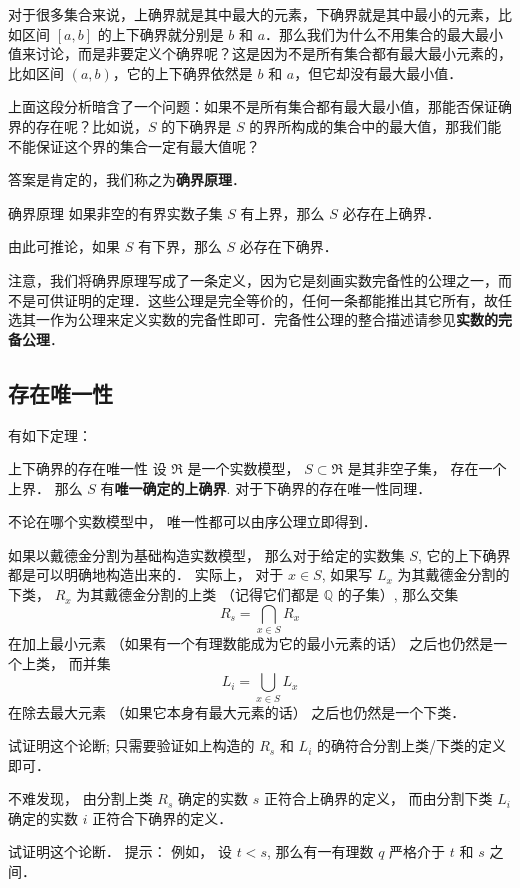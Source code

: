 对于很多集合来说，上确界就是其中最大的元素，下确界就是其中最小的元素，比如区间 $[a, b]$ 的上下确界就分别是 $b$ 和 $a$．那么我们为什么不用集合的最大最小值来讨论，而是非要定义个确界呢？这是因为不是所有集合都有最大最小元素的，比如区间 $(a, b)$，它的上下确界依然是 $b$ 和 $a$，但它却没有最大最小值．

上面这段分析暗含了一个问题：如果不是所有集合都有最大最小值，那能否保证确界的存在呢？比如说，$S$ 的下确界是 $S$ 的界所构成的集合中的最大值，那我们能不能保证这个界的集合一定有最大值呢？

答案是肯定的，我们称之为\textbf{确界原理}．

\begin{definition}{确界原理}
如果非空的有界实数子集 $S$ 有上界，那么 $S$ 必存在上确界．

由此可推论，如果 $S$ 有下界，那么 $S$ 必存在下确界．
\end{definition}

注意，我们将确界原理写成了一条定义，因为它是刻画实数完备性的公理之一，而不是可供证明的定理．这些公理是完全等价的，任何一条都能推出其它所有，故任选其一作为公理来定义实数的完备性即可．完备性公理的整合描述请参见\textbf{实数的完备公理}．

\subsection{存在唯一性}
有如下定理：

\begin{theorem}{上下确界的存在唯一性}
设 $\mathfrak{R}$ 是一个实数模型， $S\subset\mathfrak{R}$ 是其非空子集， 存在一个上界． 那么 $S$ 有\textbf{唯一确定的上确界}. 对于下确界的存在唯一性同理．
\end{theorem}

不论在哪个实数模型中， 唯一性都可以由序公理立即得到．

如果以戴德金分割为基础构造实数模型， 那么对于给定的实数集 $S$, 它的上下确界都是可以明确地构造出来的． 实际上， 对于 $x\in S$, 如果写 $L_x$ 为其戴德金分割的下类， $R_x$ 为其戴德金分割的上类 （记得它们都是 $\mathbb{Q}$ 的子集）, 那么交集
$$
R_s=\bigcap_{x\in S}R_x
$$
在加上最小元素 （如果有一个有理数能成为它的最小元素的话） 之后也仍然是一个上类， 而并集
$$
L_i=\bigcup_{x\in S}L_x
$$
在除去最大元素 （如果它本身有最大元素的话） 之后也仍然是一个下类．

\begin{exercise}{}
试证明这个论断; 只需要验证如上构造的 $R_s$ 和 $L_i$ 的确符合分割上类/下类的定义即可．
\end{exercise}

不难发现， 由分割上类 $R_s$ 确定的实数 $s$ 正符合上确界的定义， 而由分割下类 $L_i$ 确定的实数 $i$ 正符合下确界的定义．

\begin{exercise}{}
试证明这个论断． 提示： 例如， 设 $t<s$, 那么有一有理数 $q$ 严格介于 $t$ 和 $s$ 之间． 
\end{exercise}